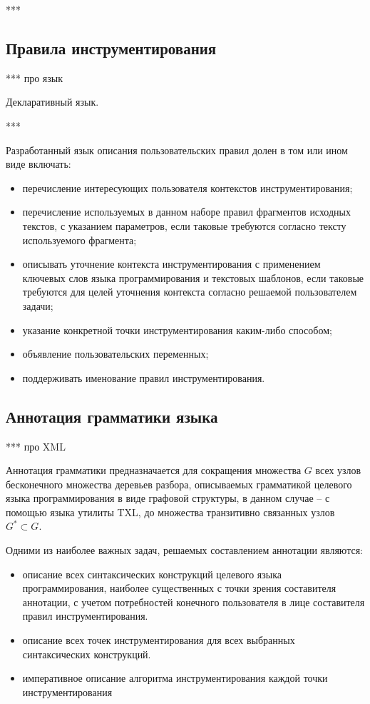 ***

\subsection{Правила инструментирования}

***
про язык

Декларативный язык.

***

Разработанный язык описания пользовательских правил долен в том или ином виде включать:

\begin{itemize}[noitemsep]
  \item перечисление интересующих пользователя контекстов инструментирования;
  \item перечисление используемых в данном наборе правил фрагментов исходных текстов, с указанием параметров, если таковые требуются согласно тексту используемого фрагмента;
  \item описывать уточнение контекста инструментирования с применением ключевых слов языка программирования и текстовых шаблонов, если таковые требуются для целей уточнения контекста согласно решаемой пользователем задачи;
  \item указание конкретной точки инструментирования каким-либо способом;
  \item объявление пользовательских переменных;
  \item поддерживать именование правил инструментирования.
\end{itemize}

\subsection{Аннотация грамматики языка}

***
про XML

Аннотация грамматики предназначается для сокращения множества $G$ всех узлов бесконечного множества деревьев разбора, описываемых грамматикой целевого языка программирования в виде графовой структуры, в данном случае -- с помощью языка утилиты TXL, до множества транзитивно связанных узлов $G^* \subset G$.

Одними из наиболее важных задач, решаемых составлением аннотации являются:

\begin{itemize}[noitemsep]
  \item описание всех синтаксических конструкций целевого языка программирования, наиболее существенных с точки зрения составителя аннотации, с учетом потребностей конечного пользователя в лице составителя правил инструментирования.
  \item описание всех точек инструментирования для всех выбранных синтаксических конструкций.
  \item императивное описание алгоритма инструментирования каждой точки инструментирования
\end{itemize}

